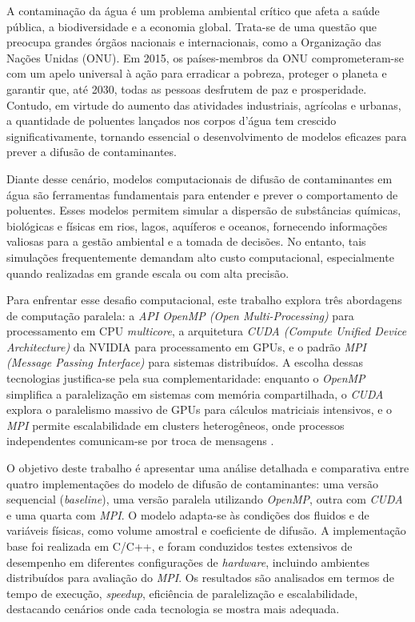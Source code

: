 \documentclass[12pt]{article}
\begin{document}
A contaminação da água é um problema ambiental crítico que afeta a saúde pública, a biodiversidade e a economia global. Trata-se de uma questão que preocupa grandes órgãos nacionais e internacionais, como a Organização das Nações Unidas (ONU). Em 2015, os países-membros da ONU comprometeram-se com um apelo universal à ação para erradicar a pobreza, proteger o planeta e garantir que, até 2030, todas as pessoas desfrutem de paz e prosperidade. Contudo, em virtude do aumento das atividades industriais, agrícolas e urbanas, a quantidade de poluentes lançados nos corpos d’água tem crescido significativamente, tornando essencial o desenvolvimento de modelos eficazes para prever a difusão de contaminantes.

Diante desse cenário, modelos computacionais de difusão de contaminantes em água são ferramentas fundamentais para entender e prever o comportamento de poluentes. Esses modelos permitem simular a dispersão de substâncias químicas, biológicas e físicas em rios, lagos, aquíferos e oceanos, fornecendo informações valiosas para a gestão ambiental e a tomada de decisões. No entanto, tais simulações frequentemente demandam alto custo computacional, especialmente quando realizadas em grande escala ou com alta precisão.

Para enfrentar esse desafio computacional, este trabalho explora três abordagens de computação paralela: a \emph{API OpenMP (Open Multi-Processing)} para processamento em CPU \emph{multicore}, a arquitetura \emph{CUDA (Compute Unified Device Architecture)} da NVIDIA para processamento em GPUs, e o padrão \emph{MPI (Message Passing Interface)} para sistemas distribuídos. A escolha dessas tecnologias justifica-se pela sua complementaridade: enquanto o \emph{OpenMP} simplifica a paralelização em sistemas com memória compartilhada, o \emph{CUDA} explora o paralelismo massivo de GPUs para cálculos matriciais intensivos, e o \emph{MPI} permite escalabilidade em clusters heterogêneos, onde processos independentes comunicam-se por troca de mensagens \cite{gropp:2014, mpi:2020}.

O objetivo deste trabalho é apresentar uma análise detalhada e comparativa entre quatro implementações do modelo de difusão de contaminantes: uma versão sequencial (\emph{baseline}), uma versão paralela utilizando \emph{OpenMP}, outra com \emph{CUDA} e uma quarta com \emph{MPI}. O modelo adapta-se às condições dos fluidos e de variáveis físicas, como volume amostral e coeficiente de difusão. A implementação base foi realizada em C/C++, e foram conduzidos testes extensivos de desempenho em diferentes configurações de \emph{hardware}, incluindo ambientes distribuídos para avaliação do \emph{MPI}. Os resultados são analisados em termos de tempo de execução, \emph{speedup}, eficiência de paralelização e escalabilidade, destacando cenários onde cada tecnologia se mostra mais adequada.
\end{document}
